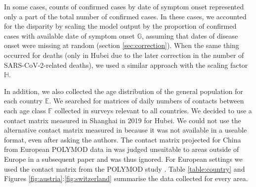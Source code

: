\documentclass{article}
\begin{document}
In some cases, counts of confirmed cases by date of symptom onset represented only a part of the total number of confirmed cases. In these cases, we accounted for the disparity by scaling the model output by the proportion of confirmed cases with available date of symptom onset $\mathds{G}$, assuming that dates of disease onset were missing at random (section \ref{sec:correction}).
When the same thing occurred for deaths (only in Hubei due to the later correction in the number of SARS-CoV-2-related deaths), we used a similar approach with the scaling factor $\mathds{H}$.

In addition, we also collected the age distribution of the general population for each country $\mathds{E}$.
We searched for matrices of daily numbers of contacts between each age class $\mathds{F}$ collected in surveys relevant to all countries. 
We decided to use a contact matrix measured in Shanghai in 2019 for Hubei\cite{Zhang2019}. 
We could not use the alternative contact matrix measured in \cite{read2014social} because it was not available in a useable format, even after asking the authors.
The contact matrix projected for China from European POLYMOD data in \cite{prem2017projecting} was judged unsuitable to areas outside of Europe in a subsequent paper \cite{arregui2018projecting} and was thus ignored.
For European settings we used the contact matrix from the POLYMOD study \cite{mossong2008social}.
 Table \ref{table:country} and Figures \ref{fig:austria}:\ref{fig:switzerland} summarise the data collected for every area.
\end{document}
